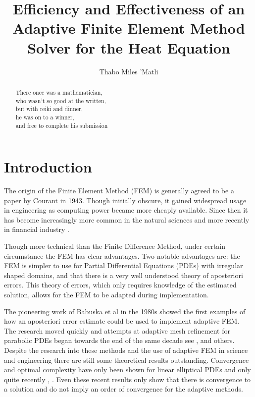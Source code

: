 \documentclass{uonmathreport}
\title{Efficiency and Effectiveness of an Adaptive Finite Element Method Solver for the Heat Equation}
\author{Thabo Miles 'Matli}
\theoremstyle{definition}
\theoremstyle{problem}
\theoremstyle{theorem}
\begin{document}
\maketitle


\begin{abstract}
There once was a mathematician,\\
who wasn't so good at the written,\\
but with reiki and dinner,\\
he was on to a winner,\\
and free to complete his submission\\
\end{abstract}

\setcounter{tocdepth}{2}  %
\tableofcontents 
\newpage

\section{Introduction} \label{sec:intro}

The origin of the Finite Element Method (FEM) is generally agreed to be a paper by Courant \cite{courant1943} in 1943. Though initially obscure, it gained widespread usage in engineering as computing power became more cheaply available. Since then it has become increasingly more common in the natural sciences and more recently in financial industry \cite{topper2005option}. 

Though more technical than the Finite Difference Method, under certain circumstance the FEM has clear advantages. Two notable advantages are: the FEM is simpler to use for Partial Differential Equations (PDEs) with irregular shaped domains, and that there is a very well understood theory of aposteriori errors. This theory of errors, which only requires knowledge of the estimated solution, allows for the FEM to be adapted during implementation. 

The pioneering work of Babuska et al \cite{babuska1981posteriori} in the 1980s showed the first examples of how an aposteriori error estimate could be used to implement adaptive FEM. The research moved quickly and attempts at adaptive mesh refinement for parabolic PDEs began towards the end of the same decade see \cite{eriksson1991adaptive}, \cite{johnson1988error} and others. Despite the research into these methods and the use of adaptive FEM in science and engineering there are still some theoretical results outstanding. Convergence and optimal complexity have only been shown for linear elliptical PDEs and only quite recently \cite{morin2008basic}, \cite{siebert2011convergence}. Even these recent results only show that there is convergence to a solution and do not imply an order of convergence for the adaptive methods.
\end{document}

